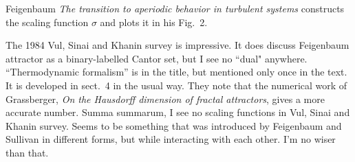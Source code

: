 \begin{description}
Feigenbaum {\em The transition to aperiodic behavior in
turbulent systems} constructs the scaling function $\sigma$ and plots it in
his Fig.~2.

The 1984 Vul, Sinai and Khanin survey is impressive. It does
discuss Feigenbaum attractor as a binary-labelled Cantor set, but I see
no ``dual" anywhere. ``Thermodynamic formalism'' is in the title, but
mentioned only once in the text. It is developed in sect.~4 in the usual
way. They note that the numerical work of Grassberger,
{\em On the {Hausdorff} dimension of fractal attractors}, gives a more
accurate number. Summa summarum, I see no scaling functions in Vul, Sinai
and Khanin survey. Seems to be something that was introduced
by Feigenbaum and Sullivan in different forms, but while interacting with
each other. I'm no wiser than that.

\end{description}



\printbibliography[heading=subbibintoc,title={References}]
